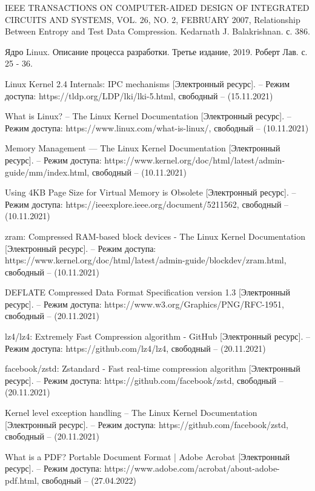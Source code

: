 \begin{thebibliography}{}
	IEEE TRANSACTIONS ON COMPUTER-AIDED DESIGN OF INTEGRATED CIRCUITS AND SYSTEMS, VOL. 26, NO. 2, FEBRUARY 2007, Relationship Between Entropy and Test Data Compression. Kedarnath J. Balakrishnan. с. 386.
	
	Ядро Linux. Описание процесса разработки. Третье издание, 2019. Роберт Лав. с. 25 - 36.
	
	Linux Kernel 2.4 Internals: IPC mechanisms [Электронный ресурс]. – Режим доступа: https://tldp.org/LDP/lki/lki-5.html, свободный – (15.11.2021)
	 
	 What is Linux? -- The Linux Kernel Documentation [Электронный ресурс]. – Режим доступа: https://www.linux.com/what-is-linux/, свободный – (10.11.2021)
	
	Memory Management — The Linux Kernel Documentation [Электронный ресурс]. – Режим доступа: https://www.kernel.org/doc/html/latest/admin-guide/mm/index.html, свободный – (10.11.2021)
	
	Using 4KB Page Size for Virtual Memory is Obsolete [Электронный ресурс]. – Режим доступа: https://ieeexplore.ieee.org/document/5211562, свободный – (10.11.2021)
	
	zram: Compressed RAM-based block devices - The Linux Kernel Documentation [Электронный ресурс]. – Режим доступа: https://www.kernel.org/doc/html/latest/admin-guide/blockdev/zram.html, свободный – (10.11.2021)
	
	DEFLATE Compressed Data Format Specification version 1.3 [Электронный ресурс]. – Режим доступа: https://www.w3.org/Graphics/PNG/RFC-1951, свободный – (20.11.2021)
	
	lz4/lz4: Extremely Fast Compression algorithm - GitHub [Электронный ресурс]. – Режим доступа: https://github.com/lz4/lz4, свободный – (20.11.2021)
	
	facebook/zstd: Zstandard - Fast real-time compression algorithm [Электронный ресурс]. – Режим доступа: https://github.com/facebook/zstd, свободный – (20.11.2021)
	
	Kernel level exception handling -- The Linux Kernel Documentation [Электронный ресурс]. – Режим доступа: https://github.com/facebook/zstd, свободный – (20.11.2021)
	
	What is a PDF? Portable Document Format | Adobe Acrobat [Электронный ресурс]. – Режим доступа: 	https://www.adobe.com/acrobat/about-adobe-pdf.html, свободный – (27.04.2022)
	

\end{thebibliography}
